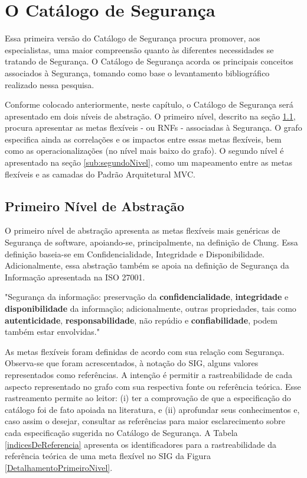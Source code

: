 \section{O Catálogo de Segurança}

Essa primeira versão do Catálogo de Segurança procura promover, aos especialistas, uma maior compreensão quanto às diferentes necessidades se tratando de Segurança. O Catálogo de Segurança acorda os principais conceitos associados à Segurança, tomando como base o levantamento bibliográfico realizado nessa pesquisa.

Conforme colocado anteriormente, neste capítulo, o Catálogo de Segurança será apresentado em dois níveis de abstração. O primeiro nível, descrito na seção \ref{sub:primeiroNivel}, procura apresentar as metas flexíveis - ou RNFs - associadas à Segurança. O grafo especifica ainda as correlações e os impactos entre essas metas flexíveis, bem como as operacionalizações (no nível mais baixo do grafo). O segundo nível é apresentado na seção \ref{sub:segundoNivel}, como um mapeamento entre as metas flexíveis e as camadas do Padrão Arquitetural MVC.

\subsection{Primeiro Nível de Abstração}
\label{sub:primeiroNivel}

O primeiro nível de abstração apresenta as metas flexíveis mais genéricas de Segurança de software, apoiando-se, principalmente, na definição de Chung. Essa definição baseia-se em Confidencialidade, Integridade e Disponibilidade. Adicionalmente, essa abstração também se apoia na definição de Segurança da Informação apresentada na ISO 27001. 

\begin{citacao}
	"Segurança da informação: preservação da \textbf{confidencialidade}, \textbf{integridade} e \textbf{disponibilidade} da informação; adicionalmente, outras propriedades, tais como \textbf{autenticidade}, \textbf{responsabilidade}, não repúdio e \textbf{confiabilidade}, podem também estar envolvidas." \cite[p. 2]{documentation2005information}
\end{citacao}


As metas flexíveis foram definidas de acordo com sua relação com Segurança. Observa-se que foram acrescentados, à notação do SIG, alguns valores representados como referências. A intenção é permitir a rastreabilidade de cada aspecto representado no grafo com sua respectiva fonte ou referência teórica. Esse rastreamento permite ao leitor: (i) ter a comprovação de que a especificação do catálogo foi de fato apoiada na literatura, e (ii) aprofundar seus conhecimentos e, caso assim o desejar, consultar as referências para maior esclarecimento sobre cada especificação sugerida no Catálogo de Segurança. A Tabela \ref{indicesDeReferencia} apresenta os identificadores para a rastreabilidade da referência teórica de uma meta flexível no SIG da Figura \ref{DetalhamentoPrimeiroNivel}. 

